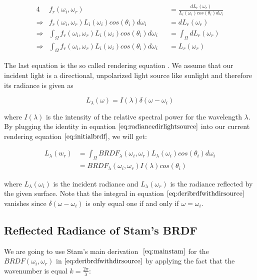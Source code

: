 \begin{alignat}{4}
& f_r(\omega_i, \omega_r) &&= \frac{dL_r(\omega_r)}{L_i(\omega_i)cos(\theta_i)d\omega_i} \nonumber \\
\Rightarrow{} & f_r(\omega_i, \omega_r) L_i(\omega_i)cos(\theta_i)d\omega_i &&= dL_r(\omega_r) \nonumber \\
\Rightarrow{} & \int_{\Omega}f_r(\omega_i, \omega_r) L_i(\omega_i)cos(\theta_i)d\omega_i &&= \int_{\Omega}dL_r(\omega_r) \nonumber\\
\Rightarrow{} & \int_{\Omega}f_r(\omega_i, \omega_r) L_i(\omega_i)cos(\theta_i)d\omega_i &&= L_r(\omega_r)
\label{eq:initialbrdf}
\end{alignat}

The last equation is the so called rendering equation $\label{sec:dirlighsourceassumption}$. We assume that our incident light is a directional, unpolarized light source like sunlight and therefore its radiance is given as 

\begin{equation}
 L_{\lambda}(\omega)=I(\lambda)\delta(\omega-\omega_i)
\label{eq:radiancedirlightsource}
\end{equation}

where $I(\lambda)$ is the intensity of the relative spectral power for the wavelength $\lambda$. By plugging the identity in equation $\ref{eq:radiancedirlightsource}$ into our current rendering equation $\ref{eq:initialbrdf}$, we will get:

\begin{align}
L_{\lambda}(w_r) 
& = \int_{\Omega} BRDF_{\lambda}(\omega_i, \omega_r) L_{\lambda}(\omega_i) cos(\theta_i) d\omega_i \nonumber \\
& = BRDF_{\lambda}(\omega_i, \omega_r) I(\lambda) cos(\theta_i)
\label{eq:deribrdfwithdirsource}
\end{align}

where $L_{\lambda}(\omega_i)$ is the incident radiance and $L_{\lambda}(\omega_r)$ is the radiance reflected by the given surface. Note that the integral in equation $\ref{eq:deribrdfwithdirsource}$ vanishes since $\delta(\omega-\omega_i)$ is only equal one if and only if $\omega = \omega_i$.

\subsection{Reflected Radiance of Stam's BRDF}
We are going to use Stam's main derivation $~\eqref{eq:mainstam}$ for the $BRDF(\omega_i, \omega_r)$ in $\ref{eq:deribrdfwithdirsource}$ by applying the fact that the wavenumber is equal $k=\frac{2\pi}{\lambda}$:

